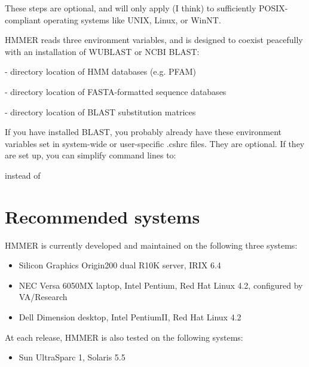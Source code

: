 These steps are optional, and will only apply (I think) to
sufficiently POSIX-compliant operating systems like UNIX, Linux, or
WinNT.

HMMER reads three environment variables, and is designed to coexist
peacefully with an installation of WUBLAST or NCBI BLAST:

\begin{wideitem}
\item[\emprog{HMMERDB}] - directory location of HMM databases (e.g. PFAM)
\item[\emprog{BLASTDB}] - directory location of FASTA-formatted sequence databases
\item[\emprog{BLASTMAT}] - directory location of BLAST substitution matrices
\end{wideitem}

If you have installed BLAST, you probably already have these 
environment variables set in system-wide or user-specific
.cshrc files. They are optional. If they are set up, you
can simplify command lines to:

\vspace{1.5em}

instead of

\vspace{1.5em}

\section{Recommended systems}

HMMER is currently developed and maintained on the following three
systems:

\begin{itemize}
\item Silicon Graphics Origin200 dual R10K server, IRIX 6.4
\item NEC Versa 6050MX laptop, Intel Pentium, 
      Red Hat Linux 4.2, configured by VA/Research
\item Dell Dimension desktop, Intel PentiumII, Red Hat
      Linux 4.2
\end{itemize}

At each release, HMMER is also tested on the following systems:

\begin{itemize}
\item Sun UltraSparc 1, Solaris 5.5
\end{itemize}

